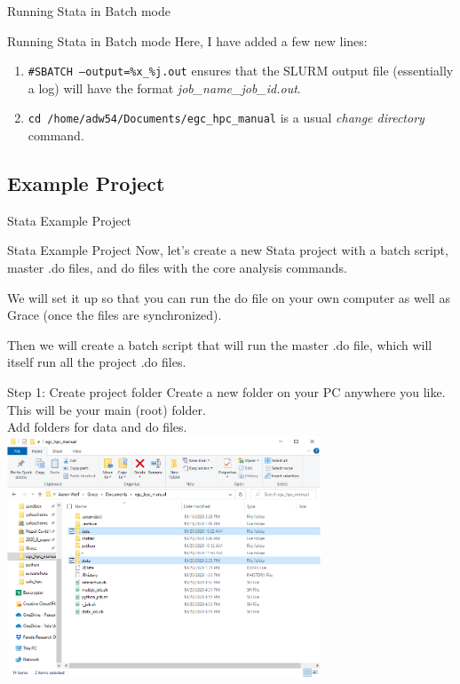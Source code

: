 \documentclass[10pt,xcolor={svgnames}]{beamer}
\begin{document}
\begin{frame}[fragile]{Running Stata in Batch mode}

\end{frame}

\begin{frame}[fragile]{Running Stata in Batch mode}
Here, I have added a few new lines:
\begin{enumerate}
\item \alert{\texttt{\#SBATCH --output=\%x\_\%j.out}} ensures that the SLURM output file (essentially a log) will have the format \textit{job\_name\_job\_id.out}. 
\item \texttt{cd /home/adw54/Documents/egc\_hpc\_manual} is a usual \textit{change directory} command.
\end{enumerate}
\end{frame}

\subsection{Example Project}
\begin{frame}[standout]
  Stata Example Project
\end{frame}

\begin{frame}{Stata Example Project}
Now, let's create a new Stata project with a batch script, master .do files, and do files with the core analysis commands.

We will set it up so that you can run the do file on your own computer as well as Grace (once the files are synchronized).

Then we will create a batch script that will run the master .do file, which will itself run all the project .do files.
\end{frame}

\begin{frame}{Step 1: Create project folder}
\center
Create a new folder on your PC anywhere you like. This will be your main (root) folder. \\ Add folders for data and do files.
\includegraphics[width=0.7\textwidth]{screenshots/fig9a.PNG} 
\end{frame}
\end{document}
